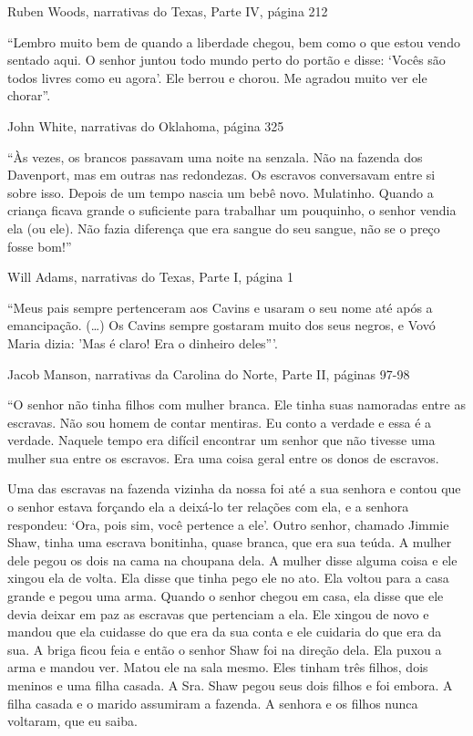 Ruben Woods, narrativas do Texas, Parte IV, página 212

``Lembro muito bem de quando a liberdade chegou, bem como o que estou
vendo sentado aqui. O senhor juntou todo mundo perto do portão e disse:
`Vocês são todos livres como eu agora'. Ele berrou e chorou. Me agradou
muito ver ele chorar''.

John White, narrativas do Oklahoma, página 325

``Às vezes, os brancos passavam uma noite na senzala. Não na fazenda dos
Davenport, mas em outras nas redondezas. Os escravos conversavam entre
si sobre isso. Depois de um tempo nascia um bebê novo. Mulatinho. Quando
a criança ficava grande o suficiente para trabalhar um pouquinho, o
senhor vendia ela (ou ele). Não fazia diferença que era sangue do seu
sangue, não se o preço fosse bom!''

Will Adams, narrativas do Texas, Parte I, página 1

``Meus pais sempre pertenceram aos Cavins e usaram o seu nome até após a
emancipação. (\ldots{}) Os Cavins sempre gostaram muito dos seus negros,
e Vovó Maria dizia: 'Mas é claro! Era o dinheiro deles'''.

Jacob Manson, narrativas da Carolina do Norte, Parte II, páginas 97-98

``O senhor não tinha filhos com mulher branca. Ele tinha suas namoradas
entre as escravas. Não sou homem de contar mentiras. Eu conto a verdade
e essa é a verdade. Naquele tempo era difícil encontrar um senhor que
não tivesse uma mulher sua entre os escravos. Era uma coisa geral entre
os donos de escravos.

Uma das escravas na fazenda vizinha da nossa foi até a sua senhora e
contou que o senhor estava forçando ela a deixá-lo ter relações com ela,
e a senhora respondeu: `Ora, pois sim, você pertence a ele'. Outro
senhor, chamado Jimmie Shaw, tinha uma escrava bonitinha, quase branca,
que era sua teúda. A mulher dele pegou os dois na cama na choupana dela.
A mulher disse alguma coisa e ele xingou ela de volta. Ela disse que
tinha pego ele no ato. Ela voltou para a casa grande e pegou uma arma.
Quando o senhor chegou em casa, ela disse que ele devia deixar em paz as
escravas que pertenciam a ela. Ele xingou de novo e mandou que ela
cuidasse do que era da sua conta e ele cuidaria do que era da sua. A
briga ficou feia e então o senhor Shaw foi na direção dela. Ela puxou a
arma e mandou ver. Matou ele na sala mesmo. Eles tinham três filhos,
dois meninos e uma filha casada. A Sra. Shaw pegou seus dois filhos e
foi embora. A filha casada e o marido assumiram a fazenda. A senhora e
os filhos nunca voltaram, que eu saiba.


